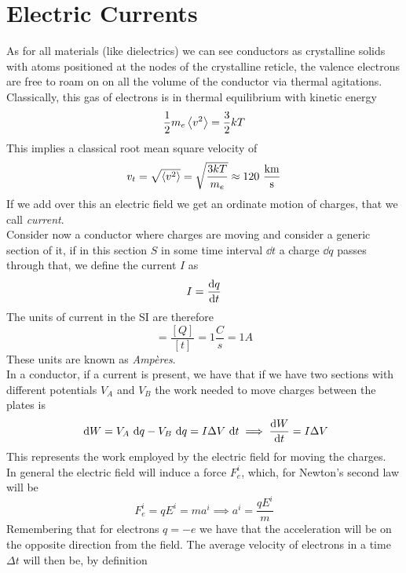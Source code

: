 \documentclass[../electromagnetism]{subfiles}
\begin{document}
\section{Electric Currents}
As for all materials (like dielectrics) we can see conductors as crystalline solids with atoms positioned at the nodes of the crystalline reticle, the valence electrons are free to roam on on all the volume of the conductor via thermal agitations.\\
Classically, this gas of electrons is in thermal equilibrium with kinetic energy
\begin{equation*}
	\frac{1}{2}m_e\expval{v^2}=\frac{3}{2}kT
\end{equation*}
This implies a classical root mean square velocity of
\begin{equation*}
	v_t=\sqrt{\expval{v^2}}=\sqrt{\frac{3kT}{m_e}}\approx120\ \mathrm{\frac{km}{s}}
\end{equation*}
If we add over this an electric field we get an ordinate motion of charges, that we call \textit{current}.\\
Consider now a conductor where charges are moving and consider a generic section of it, if in this section $S$ in some time interval $\dd t$ a charge $\dd q$ passes through that, we define the current $I$ as
\begin{equation}
	I=\dv{q}{t}
	\label{eq:currentdef}
\end{equation}
The units of current in the SI are therefore
\begin{equation}
	[I]=\frac{[Q]}{[t]}=1\unit{\frac{C}{s}}=1\unit{A}
	\label{eq:amperedef}
\end{equation}
These units are known as \textit{Ampères}.\\
In a conductor, if a current is present, we have that if we have two sections with different potentials $V_A$ and $V_B$ the work needed to move charges between the plates is
\begin{equation}
	\ \mathrm{d} W=V_A\ \mathrm{d} q-V_B\ \mathrm{d} q=I\Delta V\ \mathrm{d} t\implies\dv{W}{t}=I\Delta V
	\label{eq:workplates}
\end{equation}
This represents the work employed by the electric field for moving the charges.\\
In general the electric field will induce a force $F^i_e$, which, for Newton's second law will be
\begin{equation}
	F^i_e=qE^i=ma^i\implies a^i=\frac{qE^i}{m}
	\label{eq:forceoncharge}
\end{equation}
Remembering that for electrons $q=-e$ we have that the acceleration will be on the opposite direction from the field. The average velocity of electrons in a time $\Delta t$ will then be, by definition
\end{document}
